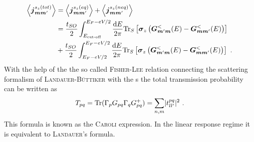 \begin{align}
\left< \boldsymbol{j}_{\boldsymbol{m}\boldsymbol{m}'}^{s_z(tot)} \right> &=\left< \boldsymbol{j}_{\boldsymbol{m}\boldsymbol{m}'}^{s_z(eq)} \right>+ \left< \boldsymbol{j}_{\boldsymbol{m}\boldsymbol{m}'}^{s_z(neq)} \right>\\
	&=\frac{t_{SO}}{2} \int_{E_{\text{cut-off}}}^{E_F-eV/2} \frac{\text{d}E}{2 \pi} \text{Tr}_S \left[\boldsymbol{\sigma}_z\left(\boldsymbol{G}^<_{\boldsymbol{m}'\boldsymbol{m}}(E)- \boldsymbol{G}^<_{\boldsymbol{m}\boldsymbol{m}'}(E)\right)\right]\\
	&+\frac{t_{SO}}{2} \int_{E_F-eV/2}^{E_F-eV/2} \frac{\text{d}E}{2 \pi} \text{Tr}_S \left[\boldsymbol{\sigma}_z\left(\boldsymbol{G}^<_{\boldsymbol{m}'\boldsymbol{m}}(E)- \boldsymbol{G}^<_{\boldsymbol{m}\boldsymbol{m}'}(E)\right)\right] \ .
	\label{eqn:gfnccurrent}
\end{align}
With the help of the the so called \textsc{Fisher-Lee} relation \cite{PhysRevB.23.6851} connecting the scattering formalism of \textsc{Landauer-B\"uttiker} with the \gfnc s the total transmission probability can be written as
\begin{align}
T_{pq} = \text{Tr}(\Gamma_p G_{pq} \Gamma_q G^+_{pq}) = \sum_{n,m} \lvert t^{pq}_{ll'}\rvert^2\ .
\label{eqn:transmissionfunction}
\end{align}
This formula is known as the \textsc{Caroli} expression. In the linear response regime it is equivalent to \textsc{Landauer}'s formula\cite{PhysRevB.72.035450}.
